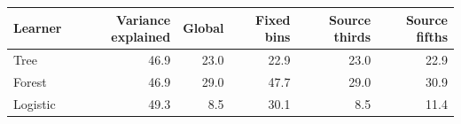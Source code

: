 \begin{tabular}{lrrrrr}
\toprule
Learner & Variance explained & Global & Fixed bins & Source thirds & Source fifths \\
\midrule
Tree & 46.9 & 23.0 & 22.9 & 23.0 & 22.9 \\
Forest & 46.9 & 29.0 & 47.7 & 29.0 & 30.9 \\
Logistic & 49.3 & 8.5 & 30.1 & 8.5 & 11.4 \\
\bottomrule
\end{tabular}
